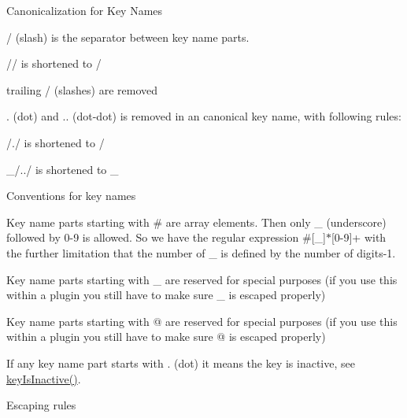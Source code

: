 \begin{DoxyItemize}
\begin{DoxyParagraph}{Canonicalization for Key Names}
\begin{DoxyItemize}
\item / (slash) is the separator between key name parts.
\item // is shortened to /
\item trailing / (slashes) are removed
\item . (dot) and .. (dot-\/dot) is removed in an canonical key name, with following rules\+:
\begin{DoxyItemize}
\item /./ is shortened to /
\item \+\_\+/../ is shortened to \+\_\+
\end{DoxyItemize}
\end{DoxyItemize}
\end{DoxyParagraph}
\begin{DoxyParagraph}{Conventions for key names}

\begin{DoxyItemize}
\item Key name parts starting with \# are array elements. Then only \+\_\+ (underscore) followed by 0-\/9 is allowed. So we have the regular expression \#\mbox{[}\+\_\+\mbox{]}$\ast$\mbox{[}0-\/9\mbox{]}+ with the further limitation that the number of \+\_\+ is defined by the number of digits-\/1.
\item Key name parts starting with \+\_\+ are reserved for special purposes (if you use this within a plugin you still have to make sure \+\_\+ is escaped properly)
\item Key name parts starting with @ are reserved for special purposes (if you use this within a plugin you still have to make sure @ is escaped properly)
\item If any key name part starts with . (dot) it means the key is inactive, see \hyperlink{group__keytest_gaa25f699f592031c1a0abc1504d14e13e}{key\+Is\+Inactive()}.
\end{DoxyItemize}
\end{DoxyParagraph}
\begin{DoxyParagraph}{Escaping rules}


\end{DoxyParagraph}
\end{DoxyItemize}
